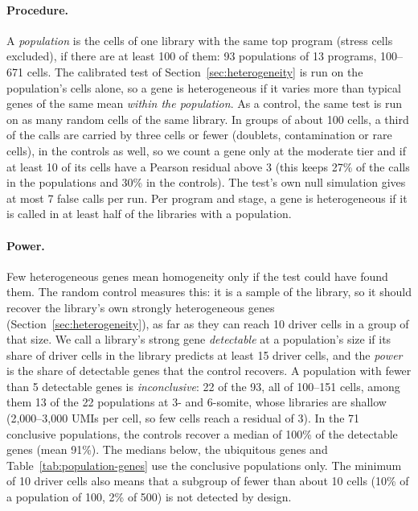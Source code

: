 \documentclass[11pt,a4paper]{article}
\begin{document}
\paragraph{Procedure.} A \emph{population} is the cells of one library with the same top program (stress cells excluded), if there are at least 100 of them: 93 populations of 13 programs, 100--671 cells. The calibrated test of Section~\ref{sec:heterogeneity} is run on the population's cells alone, so a gene is heterogeneous if it varies more than typical genes of the same mean \emph{within the population}. As a control, the same test is run on as many random cells of the same library. In groups of about 100 cells, a third of the calls are carried by three cells or fewer (doublets, contamination or rare cells), in the controls as well, so we count a gene only at the moderate tier and if at least 10 of its cells have a Pearson residual above 3 (this keeps 27\% of the calls in the populations and 30\% in the controls). The test's own null simulation gives at most 7 false calls per run. Per program and stage, a gene is heterogeneous if it is called in at least half of the libraries with a population.

\paragraph{Power.} Few heterogeneous genes mean homogeneity only if the test could have found them. The random control measures this: it is a sample of the library, so it should recover the library's own strongly heterogeneous genes (Section~\ref{sec:heterogeneity}), as far as they can reach 10 driver cells in a group of that size. We call a library's strong gene \emph{detectable} at a population's size if its share of driver cells in the library predicts at least 15 driver cells, and the \emph{power} is the share of detectable genes that the control recovers. A population with fewer than 5 detectable genes is \emph{inconclusive}: 22 of the 93, all of 100--151 cells, among them 13 of the 22 populations at 3- and 6-somite, whose libraries are shallow (2{,}000--3{,}000 UMIs per cell, so few cells reach a residual of 3). In the 71 conclusive populations, the controls recover a median of 100\% of the detectable genes (mean 91\%). The medians below, the ubiquitous genes and Table~\ref{tab:population-genes} use the conclusive populations only. The minimum of 10 driver cells also means that a subgroup of fewer than about 10 cells (10\% of a population of 100, 2\% of 500) is not detected by design.
\end{document}
